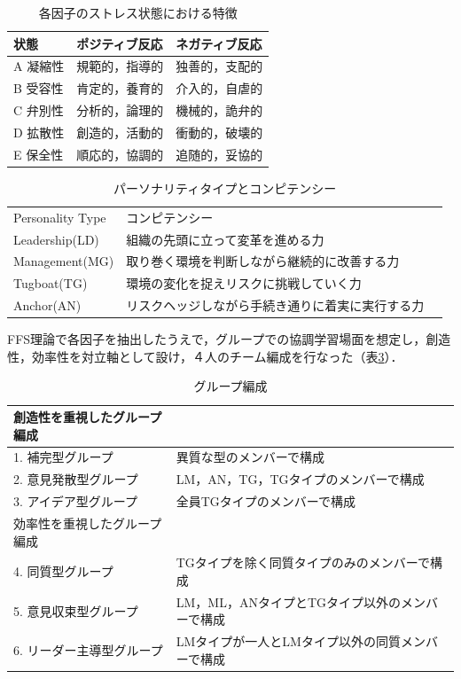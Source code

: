 \documentclass{funthesis}
\begin{document}
\begin{table}[h]
\begin{center}
  \caption{各因子のストレス状態における特徴}
  \begin{tabular}{lll} \hline
    状態 & ポジティブ反応 & ネガティブ反応\tabularnewline \hline
    A 凝縮性& 規範的，指導的 & 
    独善的，支配的\tabularnewline
    B 受容性 &肯定的，養育的 & 
    介入的，自虐的\tabularnewline
    C 弁別性&分析的，論理的 &
    機械的，詭弁的\tabularnewline
    D 拡散性&創造的，活動的 &
    衝動的，破壊的\tabularnewline
    E 保全性&順応的，協調的 &
    追随的，妥協的\tabularnewline
    \hline
  \end{tabular}

  \label{FFS理論}
  \end{center}
\end{table}

\begin{table}[h]
\begin{center}

  \caption{パーソナリティタイプとコンピテンシー}
  
  \begin{tabular}{lll} \hline
    Personality Type &  コンピテンシー\tabularnewline
   Leadership(LD)& 組織の先頭に立って変革を進める力  \tabularnewline
    Management(MG) & 取り巻く環境を判断しながら継続的に改善する力 \tabularnewline
    Tugboat(TG)& 環境の変化を捉えリスクに挑戦していく力\tabularnewline
    Anchor(AN)&リスクヘッジしながら手続き通りに着実に実行する力 \tabularnewline
    \hline
  \end{tabular}
  \label{FFS理論2}
  \end{center}
\end{table}

FFS理論で各因子を抽出したうえで，グループでの協調学習場面を想定し，創造性，効率性を対立軸として設け，４人のチーム編成を行なった（表\ref{FFS理論3}）．

\begin{table}[h]
\begin{center}

  \caption{グループ編成}
  \begin{tabular}{ll} \hline
    創造性を重視したグループ編成\tabularnewline \hline
   1. 補完型グループ& 異質な型のメンバーで構成  \tabularnewline
   2. 意見発散型グループ & LM，AN，TG，TGタイプのメンバーで構成 \tabularnewline
    3. アイデア型グループ& 全員TGタイプのメンバーで構成\tabularnewline \hline
    効率性を重視したグループ編成 \tabularnewline \hline
    4. 同質型グループ& TGタイプを除く同質タイプのみのメンバーで構成  \tabularnewline
    5. 意見収束型グループ & LM，ML，ANタイプとTGタイプ以外のメンバーで構成 \tabularnewline
    6. リーダー主導型グループ&LMタイプが一人とLMタイプ以外の同質メンバーで構成\tabularnewline
    \hline
  \end{tabular}
  \label{FFS理論3}
  \end{center}
\end{table}
\end{document}
